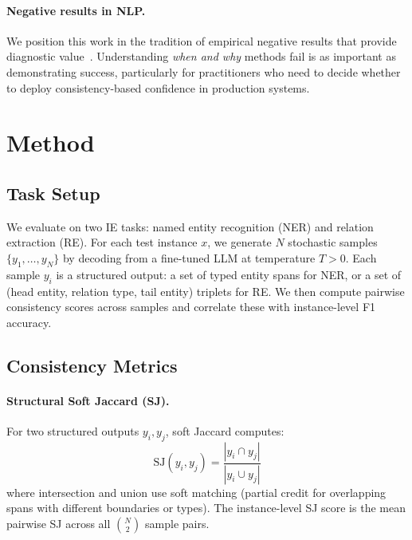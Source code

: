 \documentclass[11pt,a4paper]{article}
\begin{document}
\paragraph{Negative results in NLP.}
We position this work in the tradition of empirical negative results that provide diagnostic value~\cite{rogers2020primer}.
Understanding \emph{when and why} methods fail is as important as demonstrating success, particularly for practitioners who need to decide whether to deploy consistency-based confidence in production systems.

\section{Method}
\label{sec:method}

\subsection{Task Setup}

We evaluate on two IE tasks: named entity recognition (NER) and relation extraction (RE).
For each test instance $x$, we generate $N$ stochastic samples $\{y_1, \ldots, y_N\}$ by decoding from a fine-tuned LLM at temperature $T > 0$.
Each sample $y_i$ is a structured output: a set of typed entity spans for NER, or a set of (head entity, relation type, tail entity) triplets for RE.
We then compute pairwise consistency scores across samples and correlate these with instance-level F1 accuracy.

\subsection{Consistency Metrics}

\paragraph{Structural Soft Jaccard (SJ).}
For two structured outputs $y_i, y_j$, soft Jaccard computes:
\begin{equation}
\text{SJ}(y_i, y_j) = \frac{|y_i \cap y_j|}{|y_i \cup y_j|}
\end{equation}
where intersection and union use soft matching (partial credit for overlapping spans with different boundaries or types).
The instance-level SJ score is the mean pairwise SJ across all $\binom{N}{2}$ sample pairs.
\end{document}

